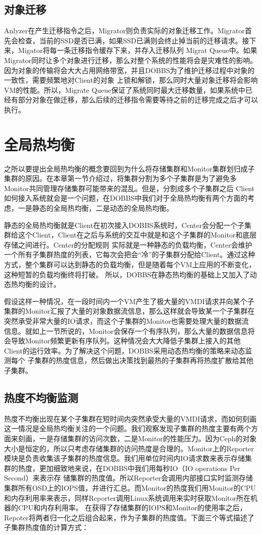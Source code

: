 \subsection{对象迁移}
Anlyzer在产生迁移指令之后，Migrator则负责实际的对象迁移工作。Migrator首先会检查，当前的SSD是否已满，如果SSD已满则会终止掉当前的迁移请求。接下来，Migator将每一条迁移指令缓存下来，并存入迁移队列
Migrat Queue中。如果Migrator同时让多个对象进行迁移，那么对整个系统的性能将会是灾难性的影响。因为对象的传输将会大大占用网络带宽，并且DOBBS为了维护迁移过程中对象的一致性，需要频繁地对Client的对象
上锁和解锁，那么同时大量对象迁移将会影响VM的性能。所以，Migrate Queue保证了系统同时最大迁移数量，如果系统中已经有部分对象在做迁移，那么后续的迁移指令需要等待之前的迁移完成之后才可以执行。

\section{全局热均衡}
之所以要提出全局热均衡的概念要回到为什么将存储集群和Monitor集群划归成子集群的原因。在本章第一节介绍过，将集群分割为多个子集群是为了避免多Monitor共同管理存储集群可能带来的混乱。但是，分割成多个子集群之后
Client如何接入系统就会是一个问题，在DOBBS中我们对于全局热均衡有两个方面的考虑，一是静态的全局热均衡，二是动态的全局热均衡。

静态的全局热均衡就是Client在初次接入DOBBS系统时，Center会分配一个子集群给这个Client，Client在之后与系统的交互中就是和这个子集群的Monitor和底层存储之间进行。Center的分配规则
实际就是一种静态的负载均衡，Center会维护一个所有子集群热度的列表，它每次会把会“冷”的子集群分配给Client。通过这种方式，整个集群可以达到静态的负载均衡，但是随着每个VM上应用的不断变化，这种短暂的负载均衡终将打破。
所以，DOBBS在静态热均衡的基础上又加入了动态热均衡的设计。

假设这样一种情况，在一段时间内一个VM产生了极大量的VMDI请求并向某个子集群的Monitor汇报了大量的对象数据流信息，那么这样就会导致某一个子集群在突然承受非常大量的IO请求，而这个子集群的Monitor也需要处理大量的数据流
信息。就如上一节所说的，Monitor会保存一个有序队列，那么大量的数据信息将会导致Monitor频繁更新有序队列。这种情况会大大降低子集群上接入的其他Client的运行效率。为了解决这个问题，DOBBS采用动态热均衡的策略来动态监测每个
子集群的热度信息，然后做出决策找到最热的子集群再将热度扩散给其他子集群。

\subsection{热度不均衡监测}
热度不均衡出现在某个子集群在短时间内突然承受大量的VMDI请求，而如何刻画这一情况是全局热均衡关注的一个问题。我们观察发现子集群的热度主要有两个方面来刻画，一是存储集群的访问次数，二是Monitor的性能压力。因为Ceph的对象
大小是恒定的，所以只考虑存储集群的访问热度是合理的。Monitor上的Reporter模块是负责收集该子集群的热度信息。我们用单位时间内IO请求数来表示存储集群的热度，更加细致地来说，在DOBBS中我们用每秒IO（IO operations Per Second）来表示存
储集群的热度值。所以Reporter会调用内部接口实时监测存储集群所有OSD上的IOPS值，并进行汇总。而Monitor的热度我们用Monitor的CPU和内存利用率来表示，同样Reporter调用Linux系统调用来实时获取Monitor所在机器的CPU和内存利用率。
在获得了存储集群的IOPS和Monitor的使用率之后，Repoter将两者归一化之后组合起来，作为子集群的热度值。下面三个等式描述了子集群热度值的计算方式：



